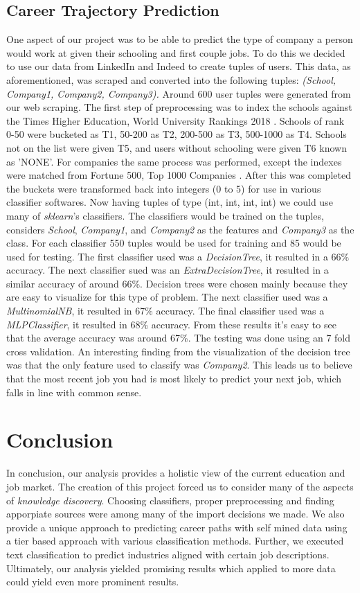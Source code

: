\subsection{Career Trajectory Prediction}
One aspect of our project was to be able to predict the type of company a person would work at given their schooling and first couple jobs.
To do this we decided to use our data from LinkedIn and Indeed to create tuples of users.
This data, as aforementioned, was scraped and converted into the following tuples: \emph{(School, Company1, Company2, Company3).}
Around 600 user tuples were generated from our web scraping.
The first step of preprocessing was to index the schools against the Times Higher Education, World University Rankings 2018 \cite{timesHigher}. Schools of rank 0-50 were bucketed as T1, 50-200 as T2, 200-500 as T3, 500-1000 as T4. Schools not on the list were given T5, and users without schooling were given T6 known as 'NONE'.
For companies the same process was performed, except the indexes were matched from Fortune 500, Top 1000 Companies \cite{fortune500}.
After this was completed the buckets were transformed back into integers (0 to 5) for use in various classifier softwares. Now having tuples of type (int, int, int, int) we could use many of \emph{sklearn}'s classifiers.
The classifiers would be trained on the tuples, considers \emph{School}, \emph{Company1}, and \emph{Company2} as the features and \emph{Company3} as the class.
For each classifier 550 tuples would be used for training and 85 would be used for testing. 
The first classifier used was a \emph{DecisionTree}, it resulted in a 66\% accuracy. The next classifier sued was an \emph{ExtraDecisionTree}, it resulted in a similar accuracy of around 66\%. Decision trees were chosen mainly because they are easy to visualize for this type of problem. The next classifier used was a \emph{MultinomialNB}, it resulted in 67\% accuracy. The final classifier used was a \emph{MLPClassifier}, it resulted in 68\% accuracy. From these results it's easy to see that the average accuracy was around 67\%. The testing was done using an 7 fold cross validation. An interesting finding from the visualization of the decision tree was that the only feature used to classify was \emph{Company2}. This leads us to believe that the most recent job you had is most likely to predict your next job, which falls in line with common sense.

\section{Conclusion}
In conclusion, our analysis provides a holistic view of the current education and job market. The creation of this project forced us to consider many of the aspects of \emph{knowledge discovery}. Choosing classifiers, proper preprocessing and finding apporpiate sources were among many of the import decisions we made. We also provide a unique approach to predicting career paths with self mined data using a tier based approach with various classification methods. Further, we executed text classification to predict industries aligned with certain job descriptions. Ultimately, our analysis yielded promising results which applied to more data could yield even more prominent results. 

